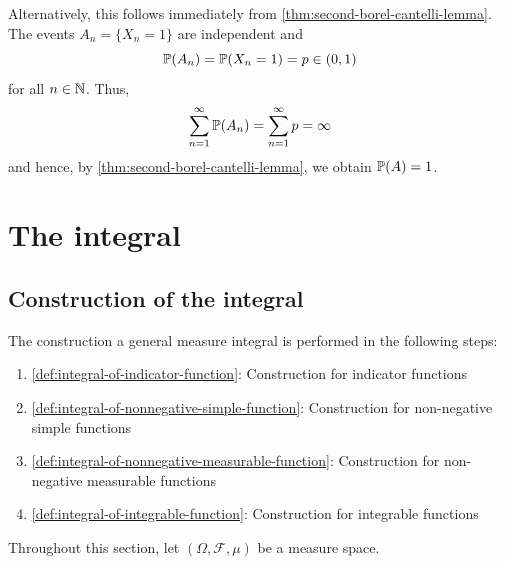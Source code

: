 \begin{solution}
\begin{enumerate}[label=(\alph*)]
Alternatively, this follows immediately from \autoref{thm:second-borel-cantelli-lemma}.
The events $A_n = \{X_n = 1\}$ are independent and %
\[
\mathbb{P}(A_n) = \mathbb{P}(X_n = 1) = p \in (0,1)
\]
for all $n \in \mathbb{N}$.
Thus,
\[
\sum_{n=1}^{\infty} \mathbb{P}(A_n)
=
\sum_{n=1}^{\infty} p
=
\infty
\]
and hence, by \autoref{thm:second-borel-cantelli-lemma}, we obtain
\(
\mathbb{P}(A)
=
1
\).
\qedhere
\end{enumerate}
\end{solution}


\clearpage






















\section{The integral}

\subsection{Construction of the integral}

The construction a general measure integral is performed in the following steps:
\begin{enumerate}
\item \autoref{def:integral-of-indicator-function}: Construction for indicator functions \label{step:integral-of-indicator-function}
\item \autoref{def:integral-of-nonnegative-simple-function}: Construction for non-negative simple functions \label{step:integral-of-nonnegative-simple-function}
\item \autoref{def:integral-of-nonnegative-measurable-function}: Construction for non-negative measurable functions \label{step:integral-of-nonnegative-measurable-function}
\item \autoref{def:integral-of-integrable-function}: Construction for integrable functions \label{step:integral-of-integrable-function}
\end{enumerate}

\medskip

Throughout this section, let $(\Omega, \mathcal{F}, \mu)$ be a measure space.


